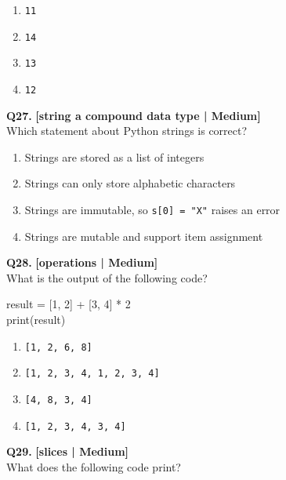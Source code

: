 \begin{enumerate}[label=(\alph*),topsep=2pt,itemsep=1pt,partopsep=0pt,parsep=0pt]
    \item \relax \texttt{11}
    \item \relax \texttt{14}
    \item \relax \texttt{13}
    \item \relax \texttt{12}
\end{enumerate}
\vspace{2mm}

\noindent\textbf{Q27.} \hfill {\small\color{LPUOrange}\textbf{[string a compound data type | Medium]}}\\[2pt]
Which statement about Python strings is correct?

\begin{enumerate}[label=(\alph*),topsep=2pt,itemsep=1pt,partopsep=0pt,parsep=0pt]
    \item \relax Strings are stored as a list of integers
    \item \relax Strings can only store alphabetic characters
    \item \relax Strings are immutable, so \texttt{s[0] = "X"} raises an error
    \item \relax Strings are mutable and support item assignment
\end{enumerate}
\vspace{2mm}

\noindent\textbf{Q28.} \hfill {\small\color{LPUOrange}\textbf{[operations | Medium]}}\\[2pt]
What is the output of the following code? 

\begin{pycode}
result = [1, 2] + [3, 4] * 2\\
print(result)
\end{pycode}

\begin{enumerate}[label=(\alph*),topsep=2pt,itemsep=1pt,partopsep=0pt,parsep=0pt]
    \item \relax \texttt{[1, 2, 6, 8]}
    \item \relax \texttt{[1, 2, 3, 4, 1, 2, 3, 4]}
    \item \relax \texttt{[4, 8, 3, 4]}
    \item \relax \texttt{[1, 2, 3, 4, 3, 4]}
\end{enumerate}
\vspace{2mm}

\noindent\textbf{Q29.} \hfill {\small\color{LPUOrange}\textbf{[slices | Medium]}}\\[2pt]
What does the following code print? 

